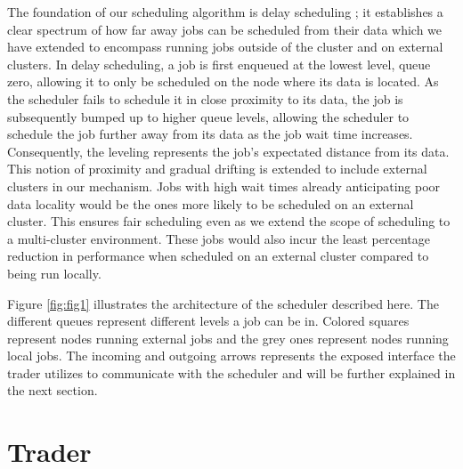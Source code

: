 The foundation of our scheduling algorithm is delay scheduling
\cite{zaharia_delay_2010}; it establishes a clear spectrum of how far away jobs
can be scheduled from their data which we have extended to encompass running jobs
outside of the cluster and on external clusters. In delay scheduling, a job is
first enqueued at the lowest level, queue zero, allowing it to only be
scheduled on the node where its data is located. As the scheduler fails to
schedule it in close proximity to its data, the job is subsequently bumped up
to higher queue levels, allowing the scheduler to schedule the job further away
from its data as the job wait time increases. Consequently, the leveling
represents the job's expectated distance from its data. This notion of proximity
and gradual drifting is extended to include external clusters in our mechanism.
Jobs with high wait times already anticipating poor data locality would be the
ones more likely to be scheduled on an external cluster. This ensures fair
scheduling even as we extend the scope of scheduling to a multi-cluster
environment. These jobs would also incur the least percentage reduction in
performance when scheduled on an external cluster compared to being run
locally.

Figure \ref{fig:fig1} illustrates the architecture of the scheduler described here. The
different queues represent different levels a job can be in. Colored squares
represent nodes running external jobs and the grey ones represent nodes running
local jobs. The incoming and outgoing arrows represents the exposed interface
the trader utilizes to communicate with the scheduler and will be further
explained in the next section.






\section{Trader} \label{trader}

